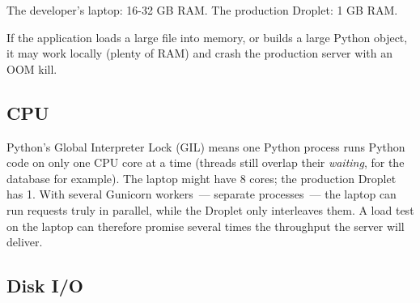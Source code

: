 The developer's laptop: 16-32 GB RAM.
The production Droplet: 1 GB RAM.

If the application loads a large file into memory, or builds a large Python object, it may work locally (plenty of RAM) and crash the production server with an OOM kill.

\begin{codebox}[short]

\begin{Shaded}
\begin{Highlighting}[]
 \NormalTok{(}\NormalTok{, }\NormalTok{) }
\OperatorTok{=}

 \NormalTok{(}\NormalTok{, }\NormalTok{) }
     \NormalTok{(}\NormalTok{), }\NormalTok{):}
\end{Highlighting}
\end{Shaded}

\end{codebox}

\subsection*{CPU}\label{39-local-vs-production:cpu}

Python's Global Interpreter Lock (GIL) means one Python process runs Python code on only one CPU core at a time (threads still overlap their \emph{waiting}, for the database for example). The laptop might have 8 cores; the production Droplet has 1. With several Gunicorn workers~--- separate processes~--- the laptop can run requests truly in parallel, while the Droplet only interleaves them. A load test on the laptop can therefore promise several times the throughput the server will deliver.

\subsection*{Disk I/O}\label{39-local-vs-production:disk-io}

